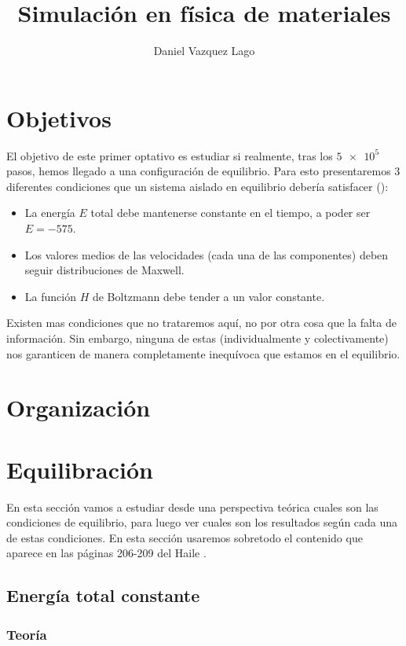 \documentclass[11pt]{article} %
\author{Daniel Vazquez Lago}
\title{Simulación en física de materiales}
\begin{document}
	
	
\maketitle
\newpage
\tableofcontents
\section{Objetivos}
	
El objetivo de este primer optativo es estudiar si realmente, tras los $\num{5e5}$ pasos, hemos llegado a una configuración de equilibrio. Para esto presentaremos 3 diferentes condiciones que un sistema aislado en equilibrio debería satisfacer (\cite{Haile}):

\begin{itemize}
 	\item La energía $E$ total debe mantenerse constante en el tiempo, a poder ser $E=-575$.
 	\item Los valores medios de las velocidades (cada una de las componentes) deben seguir distribuciones de Maxwell.
 	\item La función $H$ de Boltzmann debe tender a un valor constante. 	
\end{itemize}
Existen mas condiciones que no trataremos aquí, no por otra cosa que la falta de información. Sin embargo, ninguna de estas (individualmente y colectivamente) nos garanticen de manera completamente inequívoca que estamos en el equilibrio.
	
\section{Organización}
	
\section{Equilibración}

En esta sección vamos a estudiar desde una perspectiva teórica cuales son las condiciones de equilibrio, para luego ver cuales son los resultados según cada una de estas condiciones. En esta sección usaremos sobretodo el contenido que aparece en las páginas 206-209 del Haile \cite{Haile}. 

\subsection{Energía total constante}

\subsubsection{Teoría}
\end{document}
